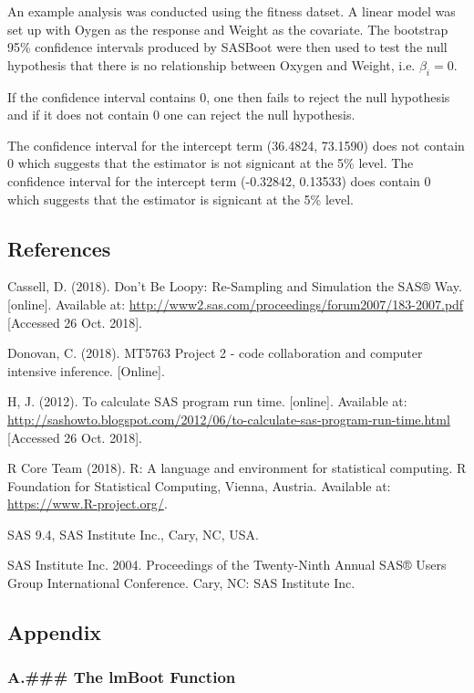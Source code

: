 \documentclass[]{article}
\begin{document}
An example analysis was conducted using the fitness datset. A linear
model was set up with Oygen as the response and Weight as the covariate.
The bootstrap 95\% confidence intervals produced by SASBoot were then
used to test the null hypothesis that there is no relationship between
Oxygen and Weight, i.e. \(\beta_i = 0\).

If the confidence interval contains 0, one then fails to reject the null
hypothesis and if it does not contain 0 one can reject the null
hypothesis.

The confidence interval for the intercept term (36.4824, 73.1590) does
not contain 0 which suggests that the estimator is not signicant at the
5\% level. The confidence interval for the intercept term (-0.32842,
0.13533) does contain 0 which suggests that the estimator is signicant
at the 5\% level.

\pagebreak 

\subsection{References}\label{references}

Cassell, D. (2018). Don't Be Loopy: Re-Sampling and Simulation the SAS®
Way. {[}online{]}. Available at:
\url{http://www2.sas.com/proceedings/forum2007/183-2007.pdf} {[}Accessed
26 Oct. 2018{]}.

Donovan, C. (2018). MT5763 Project 2 - code collaboration and computer
intensive inference. {[}Online{]}.

H, J. (2012). To calculate SAS program run time. {[}online{]}. Available
at:
\url{http://sashowto.blogspot.com/2012/06/to-calculate-sas-program-run-time.html}
{[}Accessed 26 Oct. 2018{]}.

R Core Team (2018). R: A language and environment for statistical
computing. R Foundation for Statistical Computing, Vienna, Austria.
Available at: \url{https://www.R-project.org/}.

SAS 9.4, SAS Institute Inc., Cary, NC, USA.

SAS Institute Inc. 2004. Proceedings of the Twenty-Ninth Annual SAS®
Users Group International Conference. Cary, NC: SAS Institute Inc.

\pagebreak 

\subsection{Appendix}\label{appendix}

\subsubsection{A.\#\#\# The lmBoot
Function}\label{a.-the-lmboot-function}
\end{document}
